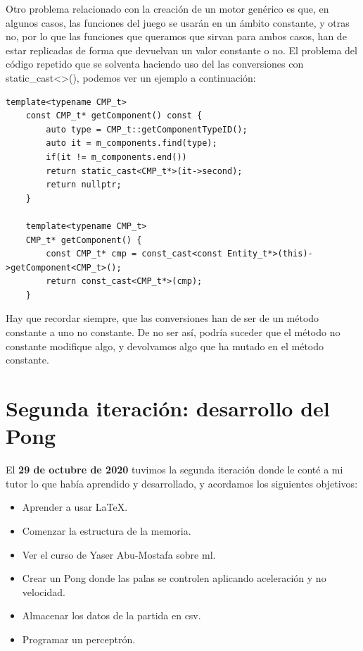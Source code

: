 Otro problema relacionado con la creación de un motor genérico es que, en algunos casos, las funciones del juego se usarán en un ámbito constante, y otras no, por lo que las funciones que queramos que sirvan para ambos casos, han de estar replicadas de forma que devuelvan un valor constante o no. El problema del código repetido que se solventa haciendo uso del las conversiones con static\_cast<>(), podemos ver un ejemplo a continuación:
\begin{lstlisting}[style=C-color, caption={Ejemplo de conversion de un método constante a no constante},label=no-constant-conversion]
	template<typename CMP_t>
	const CMP_t* getComponent() const {
		auto type = CMP_t::getComponentTypeID();
		auto it = m_components.find(type);
		if(it != m_components.end()) 
		return static_cast<CMP_t*>(it->second);
		return nullptr;
	}
	
	template<typename CMP_t>
	CMP_t* getComponent() {
		const CMP_t* cmp = const_cast<const Entity_t*>(this)->getComponent<CMP_t>();
		return const_cast<CMP_t*>(cmp);
	}
\end{lstlisting}
Hay que recordar siempre, que las conversiones han de ser de un método constante a uno no constante. De no ser así, podría suceder que el método no constante modifique algo, y devolvamos algo que ha mutado en el método constante.

\section{Segunda iteración: desarrollo del Pong}
El \textbf{29 de octubre de 2020} tuvimos la segunda iteración donde le conté a mi tutor lo que había aprendido y desarrollado, y acordamos los siguientes objetivos:
\begin{itemize}
  \item Aprender a usar \LaTeX.
  \item Comenzar la estructura de la memoria.
  \item Ver el curso de Yaser Abu-Mostafa sobre \gls{ml}.
  \item Crear un Pong donde las palas se controlen aplicando aceleración y no velocidad.
  \item Almacenar los datos de la partida en \gls{csv}.
  \item Programar un perceptrón.
\end{itemize}

